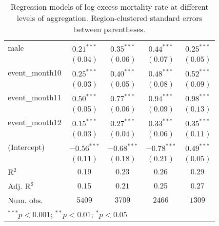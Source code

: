 \begin{table}
\begin{center}
\begin{tabular}{l c c c c}
male           & $0.21^{***}$  & $0.35^{***}$  & $0.44^{***}$  & $0.25^{***}$  \\
               & $(0.04)$      & $(0.06)$      & $(0.07)$      & $(0.05)$      \\
event\_month10 & $0.25^{***}$  & $0.40^{***}$  & $0.48^{***}$  & $0.52^{***}$  \\
               & $(0.03)$      & $(0.05)$      & $(0.08)$      & $(0.09)$      \\
event\_month11 & $0.50^{***}$  & $0.77^{***}$  & $0.94^{***}$  & $0.98^{***}$  \\
               & $(0.05)$      & $(0.06)$      & $(0.09)$      & $(0.13)$      \\
event\_month12 & $0.15^{***}$  & $0.27^{***}$  & $0.33^{***}$  & $0.35^{***}$  \\
               & $(0.03)$      & $(0.04)$      & $(0.06)$      & $(0.11)$      \\
(Intercept)    & $-0.56^{***}$ & $-0.68^{***}$ & $-0.78^{***}$ & $0.49^{***}$  \\
               & $(0.11)$      & $(0.18)$      & $(0.21)$      & $(0.05)$      \\
\hline
R$^2$          & $0.19$        & $0.23$        & $0.26$        & $0.29$        \\
Adj. R$^2$     & $0.15$        & $0.21$        & $0.25$        & $0.27$        \\
Num. obs.      & $5409$        & $3709$        & $2466$        & $1309$        \\
\hline
\multicolumn{5}{l}{\scriptsize{$^{***}p<0.001$; $^{**}p<0.01$; $^{*}p<0.05$}}
\end{tabular}
\caption{Regression models of log excess mortality rate at different levels of aggregation. Region-clustered standard errors between parentheses.}
\label{tab:regionmodels}
\end{center}
\end{table}
